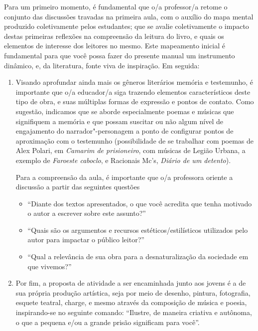 \documentclass[11pt]{extarticle}
\begin{document}
Para um primeiro momento, é fundamental que o/a
professor/a retome o conjunto das discussões travadas na primeira aula,
com o auxílio do mapa mental produzido coletivamente pelos estudantes;
que se avalie coletivamente o impacto destas primeiras reflexões na
compreensão da leitura do livro, e quais os elementos de interesse dos
leitores no mesmo. Este mapeamento inicial é fundamental para que você
possa fazer do presente manual um instrumento dinâmico, e, da literatura,
fonte viva de inspiração. Em seguida:
\begin{enumerate}

\item Visando aprofundar ainda mais os
gêneros literários memória e testemunho, é importante que o/a educador/a
siga trazendo elementos característicos deste tipo de obra, e suas
múltiplas formas de expressão e pontos de contato. Como sugestão,
indicamos que se aborde especialmente poemas e músicas que signifiquem a
memória e que possam suscitar ou não algum nível de engajamento do
narrador"-personagem a ponto de configurar pontos de aproximação com o
testemunho (possibilidade de se trabalhar com poemas de Alex Polari, em
\emph{Camarim de prisioneiro}, com músicas de Legião Urbana, a exemplo
de \emph{Faroeste caboclo}, e Racionais Mc's, \emph{Diário de um
detento}). 

Para a compreensão da aula, é importante que o/a professora
oriente a discussão a partir das seguintes questões
\begin{itemize}
\item ``Diante dos textos apresentados, o que você
acredita que tenha motivado o autor a escrever sobre este assunto?''

\item ``Quais são os argumentos e recursos estéticos/estilísticos utilizados
pelo autor para impactar o público leitor?''

\item ``Qual a relevância de sua
obra para a desnaturalização da sociedade em que vivemos?''
\end{itemize}

\item Por fim, a proposta de atividade a ser encaminhada junto aos jovens é a
de sua própria produção artística, seja por meio de desenho, pintura,
fotografia, esquete teatral, charge, e mesmo através da composição de
música e poesia, inspirando-se no seguinte comando: ``Ilustre, de maneira
criativa e autônoma, o que a pequena e/ou a grande prisão significam para
você''. 


\end{enumerate}
\end{document}
